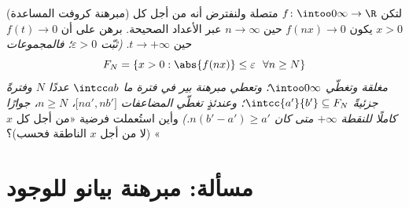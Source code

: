 \begin{exercise}[$\star\star\star$]\label{exo:b3:complete:12}
(مبرهنة كروفت المساعدة) لتكن $f\colon\intoo0\infty\to\R$ متصلة ولنفترض أنه من أجل
كل $x > 0$ يكون $f(nx) \to 0$ حين $n \to \infty$ عبر الأعداد
الصحيحة. برهن على أن $f(t) \to 0$ حين $t \to
+\infty$. \emph{(ثبّت
$\varepsilon > 0$؛ فالمجموعات
\[
F_N = \{x > 0 : \abs{f(nx)} \leq \varepsilon\ \ \forall n
\geq N\}
\]
مغلقة وتغطّي $\intoo0\infty$؛ وتعطي مبرهنة بير في فترة ما
$\intcc ab$ عددًا $N$ وفترةً جزئيةً $\intcc{a'}{b'}
\subseteq F_N$؛ وعندئذٍ تغطّي
المضاعفات $\bigl[na', nb'\bigr]$، $n
\geq N$، جوارًا كاملًا للنقطة $+\infty$ متى
كان $n(b' - a') \geq a'$.)} وأين استُعملت فرضية «من أجل كل $x$» (لا من أجل
$x$ الناطقة فحسب)؟
\end{exercise}

\section{مسألة: مبرهنة بيانو للوجود}

